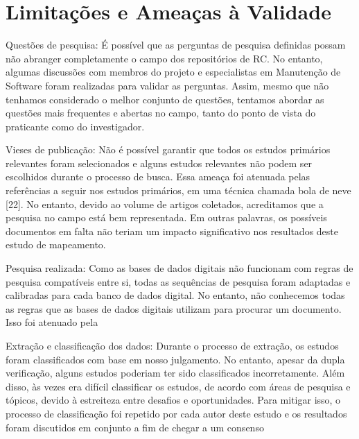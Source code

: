 \section{Limitações e Ameaças à Validade}
Questões de pesquisa: É possível que as perguntas de pesquisa definidas possam
não abranger completamente o campo dos repositórios de RC\@. No entanto, algumas
discussões com membros do projeto e especialistas em Manutenção de Software
foram realizadas para validar as perguntas. Assim, mesmo que não tenhamos
considerado o melhor conjunto de questões, tentamos abordar as questões mais
frequentes e abertas no campo, tanto do ponto de vista do praticante como do
investigador.

Vieses de publicação: Não é possível garantir que todos os estudos primários
relevantes foram selecionados e alguns estudos relevantes não podem ser
escolhidos durante o processo de busca. Essa ameaça foi atenuada pelas
referências a seguir nos estudos primários, em uma técnica chamada bola de neve
[22]. No entanto, devido ao volume de artigos coletados, acreditamos que a
pesquisa no campo está bem representada. Em outras palavras, os possíveis
documentos em falta não teriam um impacto significativo nos resultados deste
estudo de mapeamento.

Pesquisa realizada: Como as bases de dados digitais não funcionam com regras de
pesquisa compatíveis entre si, todas as sequências de pesquisa foram adaptadas e
calibradas para cada banco de dados digital. No entanto, não conhecemos todas as
regras que as bases de dados digitais utilizam para procurar um documento. Isso
foi atenuado pela

Extração e classificação dos dados: Durante o processo de extração, os estudos
foram classificados com base em nosso julgamento. No entanto, apesar da dupla
verificação, alguns estudos poderiam ter sido classificados incorretamente. Além
disso, às vezes era difícil classificar os estudos, de acordo com áreas de
pesquisa e tópicos, devido à estreiteza entre desafios e oportunidades. Para
mitigar isso, o processo de classificação foi repetido por cada autor deste
estudo e os resultados foram discutidos em conjunto a fim de chegar a um
consenso


